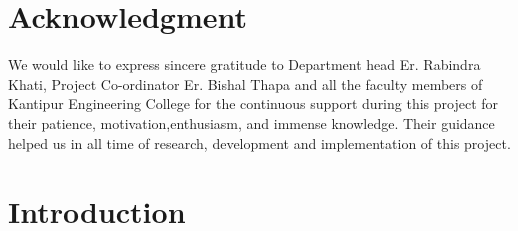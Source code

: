 \chapter*{Acknowledgment}
We would like to express sincere gratitude to Department head Er. Rabindra Khati, Project Co-ordinator Er. Bishal Thapa and all the faculty members of Kantipur Engineering College for the continuous support during this project for their patience, motivation,enthusiasm, and immense knowledge. Their guidance helped us in all time of research, development and implementation of this project.   \par
\begin{flushright}
\vskip -20pt
\submittedBy

\end{flushright}

{
\KECadjusttocspacings %
\makeatletter
\def\@makeschapterhead#1{%
  {\newpage \parindent \z@ \raggedright
    \normalfont
    \interlinepenalty\@M
    \center \fontsize{16pt}{1} \bfseries \MakeUppercase{#1}\par\nobreak
  }}
\makeatother 

\tableofcontents %
\listoffigures %
}



\newpage
{} %

\chapter{Introduction}
\vspace{-18pt}
